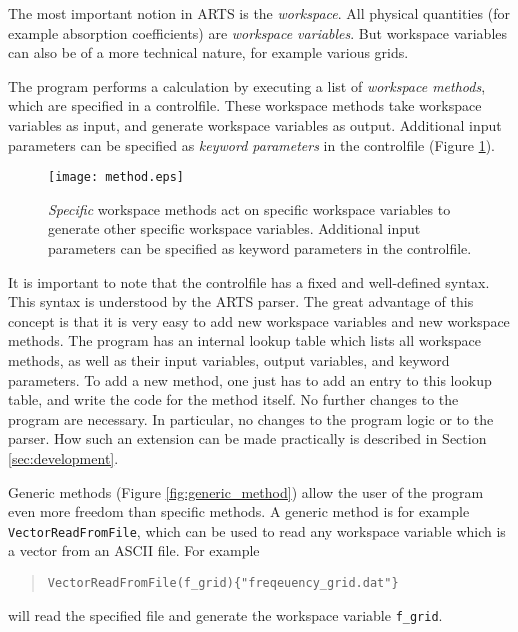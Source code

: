 \label{sec:concept:arts}

The most important notion in ARTS is the \emph{workspace}. All
physical quantities (for example absorption coefficients) are
\emph{workspace variables}. But workspace variables can also be of
a more technical nature, for example various grids. 

The program performs a calculation by executing a list of
\emph{workspace methods}, which are specified in a
controlfile. These workspace methods take workspace variables as
input, and generate workspace variables as output. Additional
input parameters can be specified as \emph{keyword parameters} in
the controlfile (Figure \ref{fig:method}).

\begin{figure}
  \begin{center}
    \texttt{[image: method.eps]}
    \caption{\emph{Specific}
        workspace methods act on specific workspace variables to
        generate other specific workspace variables. Additional input
        parameters can be specified as keyword parameters in the
        controlfile.}
    \label{fig:method}
  \end{center}
\end{figure}

It is important to note that the controlfile has a fixed and
well-defined syntax. This syntax is understood by the ARTS parser.
The great advantage of this concept is that it is very easy to add
new workspace variables and new workspace methods. The program has
an internal lookup table which lists all workspace methods, as well
as their input variables, output variables, and keyword
parameters. To add a new method, one just has to add an entry to
this lookup table, and write the code for the method itself. No
further changes to the program are necessary. In particular, no
changes to the program logic or to the parser. How such an extension
can be made practically is described in Section \ref{sec:development}.


\label{sec:concept:generic}

Generic methods (Figure \ref{fig:generic_method}) allow the user of the
program even more freedom than specific methods. A generic method is
for example \verb|VectorReadFromFile|, which can be used to read any
workspace variable which is a vector from an ASCII file. For example
\begin{quote}
  \verb|VectorReadFromFile(f_grid){"freqeuency_grid.dat"}|
\end{quote}
will read the specified file and generate the workspace variable
\verb|f_grid|.

